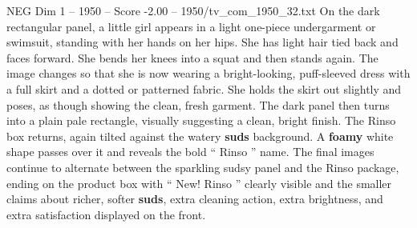 \begin{textsample}{NEG Dim 1 – 1950 – Score -2.00 – 1950/tv\_com\_1950\_32.txt}
On the dark rectangular panel, a little girl appears in a light one-piece undergarment or swimsuit, standing with her hands on her hips.
She has light hair tied back and faces forward.
She bends her knees into a squat and then stands again.
The image changes so that she is now wearing a bright-looking, puff-sleeved dress with a full skirt and a dotted or patterned fabric.
She holds the skirt out slightly and poses, as though showing the clean, fresh garment.
The dark panel then turns into a plain pale rectangle, visually suggesting a clean, bright finish.
The Rinso box returns, again tilted against the watery \textbf{suds} background.
A \textbf{foamy} white shape passes over it and reveals the bold “ Rinso ” name.
The final images continue to alternate between the sparkling sudsy panel and the Rinso package, ending on the product box with “ New!
Rinso ” clearly visible and the smaller claims about richer, softer \textbf{suds}, extra cleaning action, extra brightness, and extra satisfaction displayed on the front.

\end{textsample}
